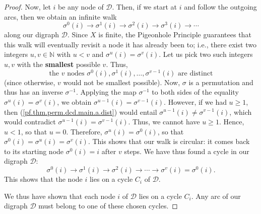 \begin{proof}
Now, let $i$ be any node of $\mathcal{D}$. Then, if we start at $i$ and follow
the outgoing arcs, then we obtain an infinite walk%
\[
\sigma^{0}\left(  i\right)  \rightarrow\sigma^{1}\left(  i\right)
\rightarrow\sigma^{2}\left(  i\right)  \rightarrow\sigma^{3}\left(  i\right)
\rightarrow\cdots
\]
along our digraph $\mathcal{D}$. Since $X$ is finite, the Pigeonhole Principle
guarantees that this walk will eventually revisit a node it has already been
to; i.e., there exist two integers $u,v\in\mathbb{N}$ with $u<v$ and
$\sigma^{u}\left(  i\right)  =\sigma^{v}\left(  i\right)  $. Let us pick two
such integers $u,v$ with the \textbf{smallest} possible $v$. Thus,
\begin{equation}
\text{the }v\text{ nodes }\sigma^{0}\left(  i\right)  ,\sigma^{1}\left(
i\right)  ,\ldots,\sigma^{v-1}\left(  i\right)  \text{ are distinct}
\label{pf.thm.perm.dcd.main.a.dist}%
\end{equation}
(since otherwise, $v$ would not be smallest possible). Now, $\sigma$ is a
permutation and thus has an inverse $\sigma^{-1}$. Applying the map
$\sigma^{-1}$ to both sides of the equality $\sigma^{u}\left(  i\right)
=\sigma^{v}\left(  i\right)  $, we obtain $\sigma^{u-1}\left(  i\right)
=\sigma^{v-1}\left(  i\right)  $. However, if we had $u\geq1$, then
(\ref{pf.thm.perm.dcd.main.a.dist}) would entail $\sigma^{u-1}\left(
i\right)  \neq\sigma^{v-1}\left(  i\right)  $,
which would contradict $\sigma^{u-1}\left(  i\right)
=\sigma^{v-1}\left(  i\right)  $. Thus, we cannot have $u\geq1$. Hence, $u<1$,
so that $u=0$. Therefore, $\sigma^{u}\left(  i\right)  =\sigma^{0}\left(
i\right)  $, so that $\sigma^{0}\left(  i\right)  =\sigma^{u}\left(  i\right)
=\sigma^{v}\left(  i\right)  $. This shows that our walk is
circular: it comes back to its starting node $\sigma^{0}\left(  i\right)  =i$
after $v$ steps. We have thus found a cycle in our digraph $\mathcal{D}$:%
\[
\sigma^{0}\left(  i\right)  \rightarrow\sigma^{1}\left(  i\right)
\rightarrow\sigma^{2}\left(  i\right)  \rightarrow\cdots\rightarrow\sigma
^{v}\left(  i\right)  =\sigma^{0}\left(  i\right)  .
\]
This shows that the node $i$ lies on a
cycle $C_{i}$ of $\mathcal{D}$.

We thus have shown that each node $i$ of
$\mathcal{D}$ lies on a cycle $C_{i}$.
Any arc of our digraph $\mathcal{D}$ must belong to one of these chosen
cycles.


\end{proof}
